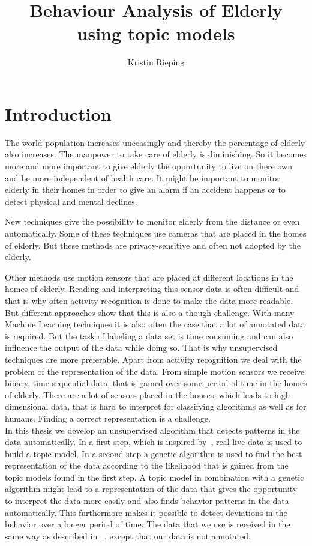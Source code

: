 \documentclass[11pt,a4paper]{article}
\title{Behaviour Analysis of Elderly using topic models}
\author{Kristin Rieping}
\begin{document}
\maketitle
\pagebreak
\tableofcontents
\pagebreak
\section{Introduction}
The world population increases unceasingly and thereby the percentage of elderly also increases. The manpower to take care of elderly is diminishing. So it becomes more and more important to give elderly the opportunity to live on there own and be more independent of health care. It might be important to monitor elderly in their homes in order to give an alarm if an accident happens or to detect physical and mental declines.

New techniques give the possibility to monitor elderly from the distance or even automatically. Some of these techniques use cameras that are placed in the homes of elderly. But these methods are privacy-sensitive and often not adopted by the elderly.

Other methods use motion sensors that are placed at different locations in the homes of elderly. %
Reading and interpreting this sensor data is often difficult and that is why often activity recognition is done to make the data more readable. But different approaches show that this is also a though challenge.
With many Machine Learning techniques it is also often the case that a lot of annotated data is required.  But the task of labeling a data set is time consuming and can also influence the output of the data while doing so. That is why unsupervised techniques are more preferable. Apart from activity recognition we deal with the problem of the representation of the data. From simple motion sensors we receive binary, time sequential data, that is gained over some period of time in the homes of elderly. There are a lot of sensors placed in the houses, which leads to high-dimensional data, that is hard to interpret for classifying algorithms as well as for humans. Finding a correct representation is a challenge.\\

In this thesis we develop an unsupervised algorithm that detects patterns in the data automatically.
In a first step, which is inspired by~\cite{farrahi2008daily}, real live data is used to build a topic model. In a second step a genetic algorithm is used to find the best representation of the data according to the likelihood that is gained from the topic models found in the first step. 
 A topic model in combination with a genetic algorithm might lead to a representation of the data that gives the opportunity to interpret the data more easily and also finds behavior patterns in the data automatically. This furthermore makes it possible to detect deviations in the behavior over a longer period of time. The data that we use is received in the same way as described in ~\cite{van2010activity}, except that our data is not annotated.\\
\end{document}
